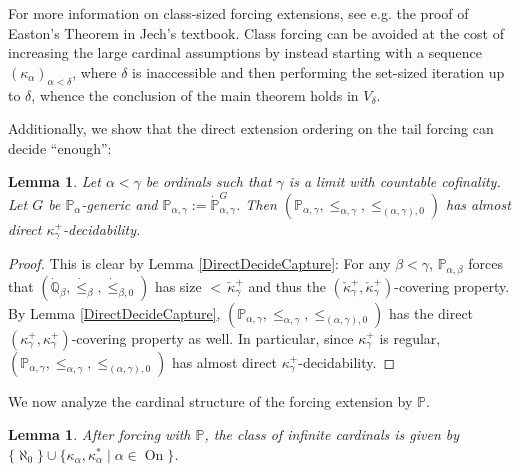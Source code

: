 \documentclass[a4paper]{amsart}
\theoremstyle{definition}
\theoremstyle{remark}
\theoremstyle{plain}
\newtheorem{mylem}[mydef]{Lemma}
\numberwithin{mydef}{section}
\DeclareMathOperator{\On}{On}
\newcommand{\dP}{\mathbb{P}}
\newcommand{\dQ}{\mathbb{Q}}
\begin{document}
	For more information on class-sized forcing extensions, see e.g. the proof of Easton's Theorem in Jech's textbook\cite[Page 235]{JechSetTheory}. Class forcing can be avoided at the cost of increasing the large cardinal assumptions by instead starting with a sequence $(\kappa_{\alpha})_{\alpha<\delta}$, where $\delta$ is inaccessible and then performing the set-sized iteration up to $\delta$, whence the conclusion of the main theorem holds in $V_{\delta}$.
	
	Additionally, we show that the direct extension ordering on the tail forcing can decide ``enough'':
	
	\begin{mylem}\label{TailAlmostDecide}
		Let $\alpha<\gamma$ be ordinals such that $\gamma$ is a limit with countable cofinality. Let $G$ be $\dP_{\alpha}$-generic and $\dP_{\alpha,\gamma}:=\dot{\dP}_{\alpha,\gamma}^G$. Then $(\dP_{\alpha,\gamma},\leq_{\alpha,\gamma},\leq_{(\alpha,\gamma),0})$ has almost direct $\kappa_{\gamma}^+$-decidability.
	\end{mylem}
	
	\begin{proof}
		This is clear by Lemma \ref{DirectDecideCapture}: For any $\beta<\gamma$, $\dP_{\alpha,\beta}$ forces that $(\dot{\dQ}_{\beta},\dot{\leq}_{\beta},\dot{\leq}_{\beta,0})$ has size ${<}\,\check{\kappa}_{\gamma}^+$ and thus the $(\check{\kappa}_{\gamma}^+,\check{\kappa}_{\gamma}^+)$-covering property. By Lemma \ref{DirectDecideCapture}, $(\dP_{\alpha,\gamma},\leq_{\alpha,\gamma},\leq_{(\alpha,\gamma),0})$ has the direct $(\kappa_{\gamma}^+,\kappa_{\gamma}^+)$-covering property as well. In particular, since $\kappa_{\gamma}^+$ is regular, $(\dP_{\alpha,\gamma},\leq_{\alpha,\gamma},\leq_{(\alpha,\gamma),0})$ has almost direct $\kappa_{\gamma}^+$-decidability.
	\end{proof}
	
	We now analyze the cardinal structure of the forcing extension by $\dP$.
	
	\begin{mylem}\label{IterPresCard}
		After forcing with $\dP$, the class of infinite cardinals is given by $\{\aleph_0\}\cup\{\kappa_{\alpha},\kappa_{\alpha}^*\;|\;\alpha\in\On\}$.
	\end{mylem}
	
\end{document}
